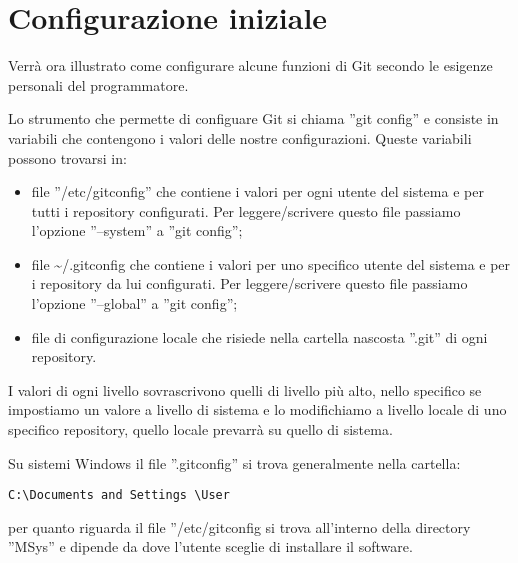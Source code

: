 \section{Configurazione iniziale}
Verrà ora illustrato come configurare alcune funzioni di Git secondo le esigenze personali del programmatore.

Lo strumento che permette di configuare Git si chiama ''git config'' e consiste in variabili che contengono i valori delle nostre configurazioni. Queste variabili possono trovarsi in:

\begin{itemize}
\item file ''/etc/gitconfig'' che contiene i valori per ogni utente del sistema e per tutti i repository configurati. Per leggere/scrivere questo file passiamo l'opzione ''--system'' a ''git config'';
\item file \textasciitilde /.gitconfig che contiene i valori per uno specifico utente del sistema e per i repository da lui configurati. Per leggere/scrivere questo file passiamo l'opzione ''--global'' a ''git config'';
\item file di configurazione locale che risiede nella cartella nascosta ''.git'' di ogni repository.
\end{itemize}

I valori di ogni livello sovrascrivono quelli di livello più alto, nello specifico se impostiamo un valore a livello di sistema e lo modifichiamo a livello locale di uno specifico repository, quello locale prevarrà su quello di sistema.

Su sistemi Windows il file ''.gitconfig'' si trova generalmente nella cartella:

\begin{center}
\texttt{C:\textbackslash Documents and Settings \textbackslash User}
\end{center}

per quanto riguarda il file ''/etc/gitconfig si trova all'interno della directory ''MSys'' e dipende da dove l'utente sceglie di installare il software.









